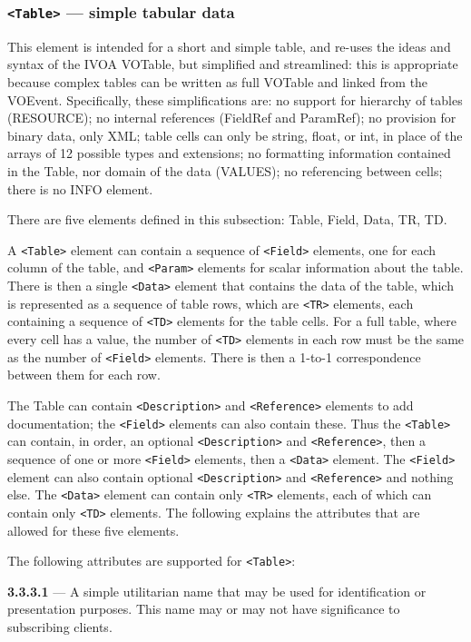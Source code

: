\documentclass[11pt,a4paper]{ivoa}
\begin{document}
\subsubsection{\texttt{<Table>} --- simple tabular data}
\label{sec:3.3.3}
This element is intended for a short and simple table, and re-uses the ideas and
syntax of the IVOA VOTable, but simplified and streamlined: this is appropriate
because complex tables can be written as full VOTable and linked from the
VOEvent. Specifically, these simplifications are: no support for hierarchy of
tables (RESOURCE); no internal references (FieldRef and ParamRef); no provision
for binary data, only XML; table cells can only be string, float, or int, in
place of the arrays of 12 possible types and extensions; no formatting
information contained in the Table, nor domain of the data (VALUES); no
referencing between cells; there is no INFO element.

There are five elements defined in this subsection: Table, Field, Data, TR, TD.

A \verb|<Table>| element can contain a sequence of \verb|<Field>| elements, one
for each column of the table, and \verb|<Param>| elements for scalar information
about the table. There is then a single \verb|<Data>| element that contains the
data of the table, which is represented as a sequence of table rows, which are
\verb|<TR>| elements, each containing a sequence of \verb|<TD>| elements for the
table cells. For a full table, where every cell has a value, the number
of \verb|<TD>| elements in each row must be the same as the number of \verb|<Field>|
elements. There is then a 1-to-1 correspondence between them for each row.

The Table can contain \verb|<Description>| and \verb|<Reference>| elements to add
documentation; the \verb|<Field>| elements can also contain these. Thus
the \verb|<Table>| can contain, in order, an optional \verb|<Description>| and 
\verb|<Reference>|, then a sequence of one or more \verb|<Field>| elements, then a
\verb|<Data>| element. The \verb|<Field>| element can also contain
optional \verb|<Description>| and \verb|<Reference>| and nothing else. The \verb|<Data>| element
can contain only \verb|<TR>| elements, each of which can contain only \verb|<TD>|
elements. The following explains the attributes that are allowed for these five
elements.

The following attributes are supported for \verb|<Table>|:

\noindent \textbf{3.3.3.1} \label{sec:3.3.3.1} --- A simple utilitarian
name that may be used for identification or presentation purposes. This name
may or may not have significance to subscribing clients.
\end{document}
